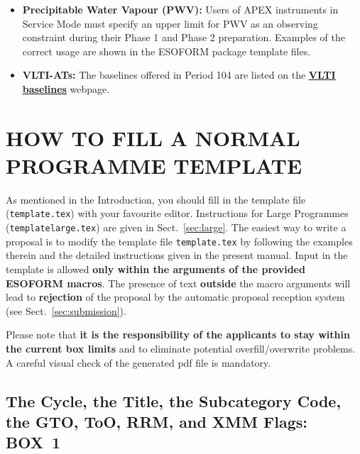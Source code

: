 \documentclass{article}
\begin{document}
\begin{itemize}

\item{\bf Precipitable Water Vapour (PWV):} Users of
APEX instruments in Service Mode must specify an upper limit for PWV
as an observing constraint during their Phase 1 and Phase 2
preparation. Examples of the correct usage are shown in the ESOFORM package 
template files.

\item{\bf VLTI-ATs:} The baselines offered in Period 104 are listed on the
\href{http://www.eso.org/sci/facilities/paranal/telescopes/vlti/configuration/index.html}
{\bf\underline{VLTI baselines}} webpage.

\end{itemize}


\section{HOW TO FILL A NORMAL PROGRAMME TEMPLATE}
\label{sec:normal}

As mentioned in the Introduction, you should fill in 
the template file ({\tt template.tex}) with your favourite editor. 
Instructions for Large Programmes
({\tt templatelarge.tex}) are given in Sect.~\ref{sec:large}. 
The easiest way to write a proposal is to modify the
template file {\tt template.tex} by following the examples therein and the
detailed instructions given in the present manual. Input in the
template is allowed {\bf only within the arguments of the provided
ESOFORM macros}. The presence of text {\bf outside} the macro
arguments will lead to {\bf rejection} of the proposal by the
automatic proposal reception system (see Sect.~\ref{sec:submission}). 

Please note that {\bf it is the responsibility of the 
applicants to stay within the current box limits} and to eliminate potential
overfill/overwrite problems. A careful visual check of the generated pdf file is mandatory.

\subsection{The Cycle, the Title, the Subcategory Code, the GTO, ToO, RRM, and XMM Flags: {\bf BOX~1}}
\end{document}
